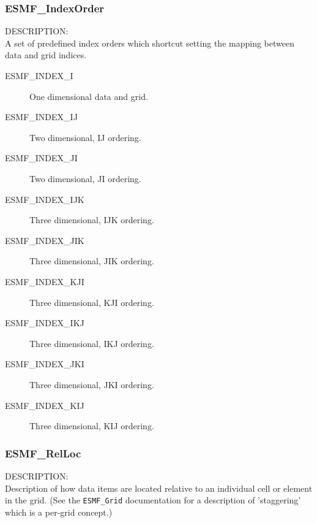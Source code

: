 

\subsubsection{ESMF\_IndexOrder}

{\sf DESCRIPTION:\\}
A set of predefined index orders which shortcut setting
the mapping between data and grid indices.

\begin{description}
   \item[ESMF\_INDEX\_I]  One dimensional data and grid.
   \item[ESMF\_INDEX\_IJ] Two dimensional, IJ ordering.
   \item[ESMF\_INDEX\_JI] Two dimensional, JI ordering.
   \item[ESMF\_INDEX\_IJK] Three dimensional, IJK ordering.
   \item[ESMF\_INDEX\_JIK] Three dimensional, JIK ordering.
   \item[ESMF\_INDEX\_KJI] Three dimensional, KJI ordering.
   \item[ESMF\_INDEX\_IKJ] Three dimensional, IKJ ordering.
   \item[ESMF\_INDEX\_JKI] Three dimensional, JKI ordering.
   \item[ESMF\_INDEX\_KIJ] Three dimensional, KIJ ordering.
\end{description}

\subsubsection{ESMF\_RelLoc}

{\sf DESCRIPTION:\\}
Description of how data items are located relative to an individual
cell or element in the grid. 
(See the {\tt ESMF\_Grid} documentation
for a description of 'staggering' which is a per-grid concept.)

